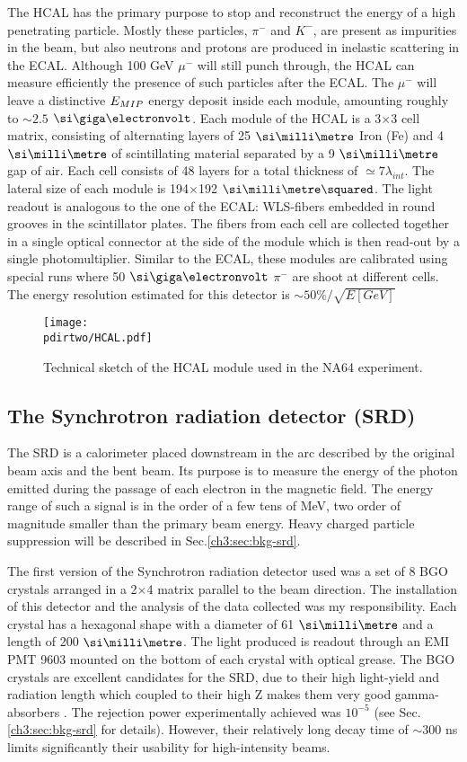 The HCAL has the primary purpose to stop and reconstruct the energy of a high penetrating particle. Mostly these particles, $\pi^-$ and $K^-$, are present as impurities in the beam, but also neutrons and protons are produced in inelastic scattering in the ECAL. Although 100 GeV $\mu^-$ will still punch through, the HCAL can measure efficiently the presence of such particles after the ECAL. The $\mu^-$ will leave a distinctive $E_{MIP}$ energy deposit inside each module, amounting roughly to $\sim 2.5$ $\gev$. Each module of the HCAL is a 3$\times$3 cell matrix, consisting of alternating layers of 25 $\mmi$ Iron (Fe) and 4 $\mmi$ of scintillating material separated by a 9 $\mmi$ gap of air. Each cell consists of 48 layers for a total thickness of $\simeq 7\lambda_{int}$. The lateral size of each module is 194$\times$192 $\mms$. The light readout is analogous to the one of the ECAL: WLS-fibers embedded in round grooves in the scintillator plates. The fibers from each cell are collected together in a single optical connector at the side of the module which is then read-out by a single photomultiplier. Similar to the ECAL, these modules are calibrated using special runs where 50 $\gev$ $\pi^-$ are shoot at different cells. The energy resolution estimated for this detector is $\sim 50\%/\sqrt{E[GeV]}$

\begin{figure}[bth!]
\centering
\texttt{[image: \\pdirtwo/HCAL.pdf]}
\caption[HCAL sketch]{Technical sketch of the HCAL module used in the NA64 experiment.}
\label{fig:hcal-sketch}
\end{figure}

\subsection{The Synchrotron radiation detector (SRD)}
\label{ch2:sec:detectors-srd}

The SRD is a calorimeter placed downstream in the arc described by the original beam axis and the bent beam. Its purpose is to measure the energy of the photon emitted during the passage of each electron in the magnetic field. The energy range of such a signal is in the order of a few tens of MeV, two order of magnitude smaller than the primary beam energy. Heavy charged particle suppression will be described in Sec.\ref{ch3:sec:bkg-srd}.

The first version of the Synchrotron radiation detector used was a set of 8 BGO crystals arranged in a 2$\times$4 matrix parallel to the beam direction. The installation of this detector and the analysis of the data collected was my responsibility. Each crystal has a hexagonal shape with a diameter of 61 $\mmi$ and a length of 200 $\mmi$. The light produced is readout through an EMI PMT 9603 mounted on the bottom of each crystal with optical grease. The BGO crystals are excellent candidates for the SRD, due to their high light-yield and radiation length which coupled to their high Z makes them very good gamma-absorbers \cite{bgo-crystal}. The rejection power experimentally achieved was $10^{-5}$ (see Sec.\ref{ch3:sec:bkg-srd} for details). However, their relatively long decay time of $\sim$300 \si{ns} limits significantly their usability for high-intensity beams.

